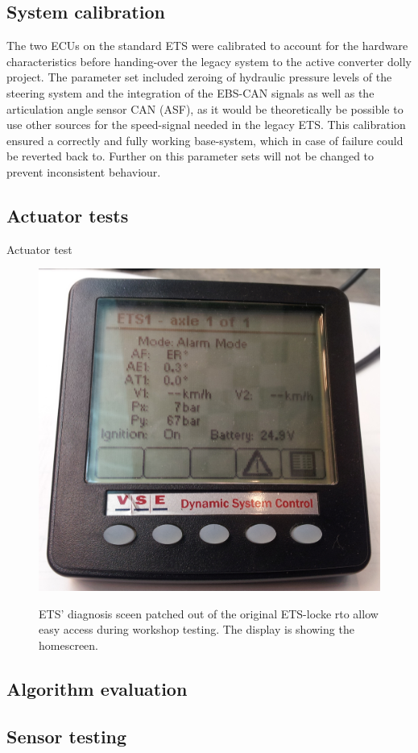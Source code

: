 \documentclass[ExampleMasters.tex]{subfiles}
\begin{document}
\subsection{System calibration}

The two ECUs on the standard ETS were calibrated to account for the hardware characteristics before handing-over the legacy system to the active converter dolly project. The parameter set included zeroing of hydraulic pressure levels of the steering system and the integration of the EBS-CAN signals as well as the articulation angle sensor CAN (ASF), as it would be theoretically be possible to use other sources for the speed-signal needed in the legacy ETS. This calibration ensured a correctly and fully working base-system, which in case of failure could be reverted back to. Further on this parameter sets will not be changed to prevent inconsistent behaviour. 

\subsection{Actuator tests}

Actuator test

\begin{figure}[h]
\centering
\includegraphics[width=0.6\linewidth]{figures/ETS_display_homescreen}
\caption{ETS' diagnosis sceen patched out of the original ETS-locke rto allow easy access during workshop testing. The display is showing the homescreen.}
\caption{}
\label{fig:ETS_display_homescreen}
\end{figure}

\subsection{Algorithm evaluation}
\subsection{Sensor testing}
\end{document}
